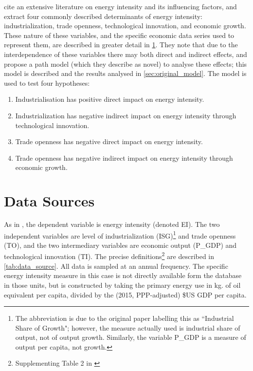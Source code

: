 \documentclass[11pt]{article}
\begin{document}
\cite{panHowIndustrializationTrade2019} cite an extensive literature on energy intensity and its influencing factors, and extract four commonly described determinants of energy intensity: industrialization, trade openness, technological innovation, and economic growth.
These nature of these variables, and the specific economic data series used to represent them, are described in greater detail in \cref{sec:data_sources}.
They note that due to the interdependence of these variables there may both direct and indirect effects, and propose a path model (which they describe as novel) to analyse these effects; this model is described and the results analysed in \cref{sec:original_model}.
The model is used to test four hypotheses:
\begin{enumerate}[label=\textbf{H.\arabic*}]
\item Industrialisation has positive direct impact on energy intensity.
\item Industrialization has negative indirect impact on energy intensity through technological innovation.
\item Trade openness has negative direct impact on energy intensity.
\item Trade openness has negative indirect impact on energy intensity through economic growth.
\end{enumerate}


\section{Data Sources}\label{sec:data_sources}
 
As in \cite{panHowIndustrializationTrade2019}, the dependent variable is energy intensity (denoted EI). The two independent variables are level of industrialization (ISG)\footnote{
The abbreviation is due to the original paper labelling this as ``Industrial Share of Growth"; however, the measure actually used is industrial share of output, not of output growth. 
Similarly, the variable P\_GDP is a measure of output per capita, not growth.
} and trade openness (TO), and the two intermediary variables are economic output (P\_GDP) and technological innovation (TI).
The precise definitions\footnote{
Supplementing Table 2 in \cite{panHowIndustrializationTrade2019}
} are described in \cref{tab:data_source}.
All data is sampled at an annual frequency.
The specific energy intensity measure in this case is not directly available form the database in those units, but is constructed by taking the primary energy use in kg. of oil equivalent per capita, divided by the (2015, PPP-adjusted) \$US GDP per capita.
\end{document}
